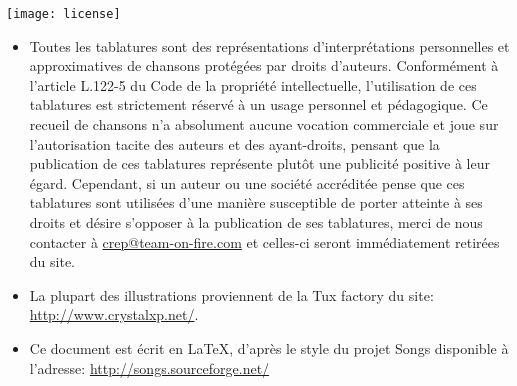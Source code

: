 \vspace{0.5cm}
\begin{center}
  \texttt{[image: license]}
\end{center}
\vspace{0.5cm}

\begin{itemize}
\item Toutes les tablatures sont des représentations d'interprétations
  personnelles et approximatives de chansons protégées par droits
  d'auteurs. Conformément à l'article L.122-5 du Code de la propriété
  intellectuelle, l'utilisation de ces tablatures est strictement
  réservé à un usage personnel et pédagogique. Ce recueil de chansons
  n'a absolument aucune vocation commerciale et joue sur
  l'autorisation tacite des auteurs et des ayant-droits, pensant que
  la publication de ces tablatures représente plutôt une publicité
  positive à leur égard. Cependant, si un auteur ou une société
  accréditée pense que ces tablatures sont utilisées d'une manière
  susceptible de porter atteinte à ses droits et désire s'opposer à la
  publication de ses tablatures, merci de nous contacter à
  \url{crep@team-on-fire.com} et celles-ci seront immédiatement
  retirées du site.
\item La plupart des illustrations proviennent de la Tux factory
  du site: \url{http://www.crystalxp.net/}.
\item Ce document est écrit en LaTeX, d'après le style du projet Songs
  disponible à l'adresse: \url{http://songs.sourceforge.net/}
\end{itemize}


